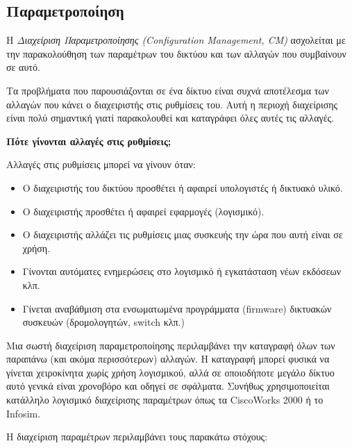 %
%
\subsection{Παραμετροποίηση}

\begin{inthebox}
H \emph{Διαχείριση Παραμετροποίησης (Configuration Management, CM)} ασχολείται με την παρακολούθηση των παραμέτρων του δικτύου και των αλλαγών που συμβαίνουν σε αυτό.\\
\end{inthebox}

Τα προβλήματα που παρουσιάζονται σε ένα δίκτυο είναι συχνά αποτέλεσμα των αλλαγών που κάνει ο διαχειριστής στις ρυθμίσεις του. Αυτή η περιοχή διαχείρισης είναι πολύ σημαντική γιατί παρακολουθεί και καταγράφει όλες αυτές τις αλλαγές.

\begin{inthebox}
\textbf{Πότε γίνονται αλλαγές στις ρυθμίσεις;}

Αλλαγές στις ρυθμίσεις μπορεί να γίνουν όταν:

\begin{itemize}
\item Ο διαχειριστής του δικτύου προσθέτει ή αφαιρεί υπολογιστές ή δικτυακό υλικό.
\item Ο διαχειριστής προσθέτει ή αφαιρεί εφαρμογές (λογισμικό).
\item Ο διαχειριστής αλλάζει τις ρυθμίσεις μιας συσκευής την ώρα που αυτή είναι σε χρήση.
\item Γίνονται αυτόματες ενημερώσεις στο λογισμικό ή εγκατάσταση νέων εκδόσεων κλπ.
\item Γίνεται αναβάθμιση στα ενσωματωμένα προγράμματα (firmware) δικτυακών συσκευών (δρομολογητών, switch κλπ.)
\end{itemize}

\end{inthebox}

Μια σωστή διαχείριση παραμετροποίησης περιλαμβάνει την καταγραφή όλων των παραπάνω (και ακόμα περισσότερων) αλλαγών. Η καταγραφή μπορεί φυσικά να γίνεται χειροκίνητα χωρίς χρήση λογισμικού, αλλά σε οποιοδήποτε μεγάλο δίκτυο αυτό γενικά είναι χρονοβόρο και οδηγεί σε σφάλματα. Συνήθως χρησιμοποιείται κατάλληλο λογισμικό διαχείρισης παραμέτρων όπως τα CiscoWorks 2000 ή το Infosim.

Η διαχείριση παραμέτρων περιλαμβάνει τους παρακάτω στόχους:

